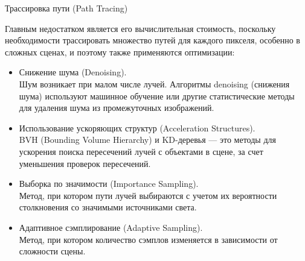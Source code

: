 \documentclass{beamer}
\begin{document}
\begin{frame}{Трассировка пути (Path Tracing)}
{		Главным недостатком является его	вычислительная стоимость, поскольку необходимости трассировать множество путей для каждого пикселя, особенно в сложных сценах, 
		и поэтому также применяются оптимизации:
			\begin{itemize}
				\item 
				Снижение шума (Denoising).\\
				Шум возникает при малом числе лучей. 
				Алгоритмы denoising (снижения шума) используют машинное обучение или другие статистические методы для удаления шума из промежуточных изображений.
				\item 
				Использование ускоряющих структур (Acceleration Structures).\\
				BVH (Bounding Volume Hierarchy) и KD-деревья — это методы для ускорения поиска пересечений лучей с объектами в сцене, за счет уменьшения проверок пересечений.
				\item 
				Выборка по значимости (Importance Sampling).\\
				Метод, при котором пути лучей выбираются с учетом их вероятности столкновения со значимыми источниками света.
				\item 
				Адаптивное сэмплирование (Adaptive Sampling).\\
				Метод, при котором количество сэмплов изменяется в зависимости от сложности сцены. 
			\end{itemize}


			

		}

	\end{frame}


\end{document}
